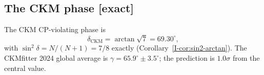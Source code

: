 \subsection{The CKM phase \textnormal{[exact]}}
\label{sec:ckm-phase}

\begin{derivation}
\label{thm:ckm-phase}
The CKM CP-violating phase is
\begin{equation}
\label{eq:delta-ckm}
  \delta_{\mathrm{CKM}}
    = \arctan\!\sqrt{7}
    = 69.30^\circ,
\end{equation}
with $\sin^2\delta = N/(N{+}1) = 7/8$ exactly
(Corollary~\ref*{I-cor:sin2-arctan}).
The CKMfitter 2024 global average is
$\gamma = 65.9^\circ \pm 3.5^\circ$; the prediction
is $1.0\sigma$ from the central value.
\end{derivation}
